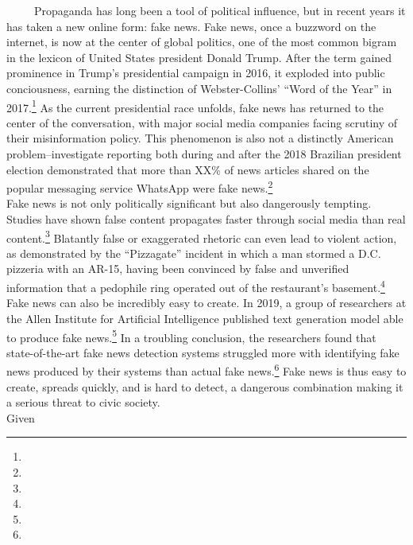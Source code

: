 \documentclass[12pt]{article}
\begin{document}
~~~~~Propaganda has long been a tool of political influence, but in
recent years it has taken a new online form: fake news. Fake news, once
a buzzword on the internet, is now at the center of global politics, one
of the most common bigram in the lexicon of United States president
Donald Trump. After the term gained prominence in Trump's presidential
campaign in 2016, it exploded into public conciousness, earning the
distinction of Webster-Collins' ``Word of the Year'' in 2017.\footnote{}
As the current presidential race unfolds, fake news has returned to the
center of the conversation, with major social media companies facing
scrutiny of their misinformation policy. This phenomenon is also not a
distinctly American problem--investigate reporting both during and after
the 2018 Brazilian president election demonstrated that more than XX\%
of news articles shared on the popular messaging service WhatsApp were
fake news.\footnote{}~\\
\hspace*{0.333em}\hspace*{0.333em}\hspace*{0.333em}\hspace*{0.333em}\hspace*{0.333em}Fake
news is not only politically significant but also dangerously tempting.
Studies have shown false content propagates faster through social media
than real content.\footnote{} Blatantly false or exaggerated rhetoric
can even lead to violent action, as demonstrated by the ``Pizzagate''
incident in which a man stormed a D.C. pizzeria with an AR-15, having
been convinced by false and unverified information that a pedophile ring
operated out of the restaurant's basement.\footnote{} Fake news can also
be incredibly easy to create. In 2019, a group of researchers at the
Allen Institute for Artificial Intelligence published text generation
model able to produce fake news.\footnote{} In a troubling conclusion,
the researchers found that state-of-the-art fake news detection systems
struggled more with identifying fake news produced by their systems than
actual fake news.\footnote{} Fake news is thus easy to create, spreads
quickly, and is hard to detect, a dangerous combination making it a
serious threat to civic society.\\
\hspace*{0.333em}\hspace*{0.333em}\hspace*{0.333em}\hspace*{0.333em}\hspace*{0.333em}Given
\end{document}
